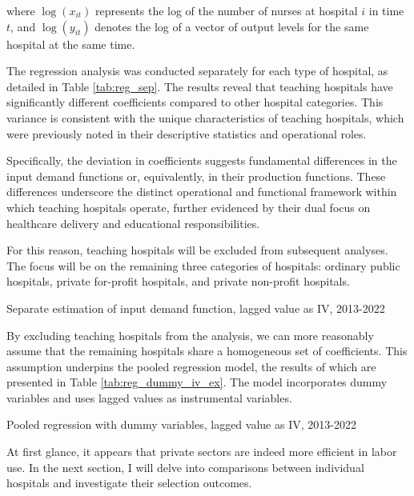\documentclass[12pt]{article}
\begin{document}
where $\log(x_{it})$ represents the log of the number of nurses at hospital $i$
in time $t$, and $\log(y_{it})$ denotes the log of a vector of output levels
for the same hospital at the same time.

The regression analysis was conducted separately for each type of hospital, as
detailed in Table \ref{tab:reg_sep}. The results reveal that teaching hospitals
have significantly different coefficients compared to other hospital
categories. This variance is consistent with the unique characteristics of
teaching hospitals, which were previously noted in their descriptive statistics
and operational roles.

Specifically, the deviation in coefficients suggests fundamental differences in
the input demand functions or, equivalently, in their production functions.
These differences underscore the distinct operational and functional framework
within which teaching hospitals operate, further evidenced by their dual focus
on healthcare delivery and educational responsibilities.

For this reason, teaching hospitals will be excluded from subsequent analyses.
The focus will be on the remaining three categories of hospitals: ordinary
public hospitals, private for-profit hospitals, and private non-profit
hospitals.

\begin{table}[h!]
    \centering
    
    \caption{Separate estimation of input demand function, lagged value as IV, 2013-2022}
    \label{tab:reg_sep}
\end{table}

By excluding teaching hospitals from the analysis, we can more reasonably
assume that the remaining hospitals share a homogeneous set of coefficients.
This assumption underpins the pooled regression model, the results of which are
presented in Table \ref{tab:reg_dummy_iv_ex}. The model incorporates dummy
variables and uses lagged values as instrumental variables.

\begin{table}[h!]
    \centering
    
    \caption{Pooled regression with dummy variables, lagged value as IV, 2013-2022}
    \label{tab:reg_dummy_iv_ex}
\end{table}

At first glance, it appears that private sectors are indeed more efficient in
labor use. In the next section, I will delve into comparisons between
individual hospitals and investigate their selection outcomes.
\end{document}
